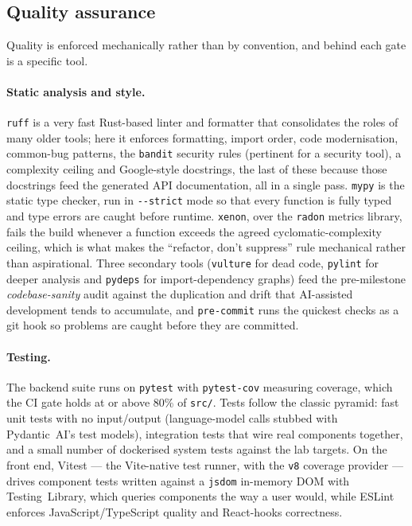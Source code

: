 \subsection{Quality assurance}
\label{subsec:qa}

Quality is enforced mechanically rather than by convention, and behind each gate is
a specific tool.

\paragraph{Static analysis and style.} \texttt{ruff} is a very fast Rust-based linter
and formatter that consolidates the roles of many older tools; here it enforces
formatting, import order, code modernisation, common-bug patterns, the \texttt{bandit}
security rules (pertinent for a security tool), a complexity ceiling and Google-style
docstrings, the last of these because those docstrings feed the generated API
documentation, all in a single pass. \texttt{mypy} is the static type checker, run in
\texttt{-{}-strict} mode so that every function is fully typed and type errors are
caught before runtime. \texttt{xenon}, over the \texttt{radon} metrics library, fails
the build whenever a function exceeds the agreed cyclomatic-complexity ceiling, which
is what makes the ``refactor, don't suppress'' rule mechanical rather than aspirational.
Three secondary tools (\texttt{vulture} for dead code, \texttt{pylint} for deeper
analysis and \texttt{pydeps} for import-dependency graphs) feed the pre-milestone
\emph{codebase-sanity} audit against the duplication and drift that AI-assisted
development tends to accumulate, and \texttt{pre-commit} runs the quickest checks as a
git hook so problems are caught before they are committed.

\paragraph{Testing.} The backend suite runs on \texttt{pytest} with \texttt{pytest-cov}
measuring coverage, which the CI gate holds at or above 80\% of \texttt{src/}. Tests
follow the classic pyramid: fast unit tests with no input/output (language-model
calls stubbed with Pydantic~AI's test models), integration tests that wire real
components together, and a small number of dockerised system tests against the lab
targets. On the front end, Vitest --- the Vite-native test runner, with the
\texttt{v8} coverage provider --- drives component tests written against a
\texttt{jsdom} in-memory DOM with Testing~Library, which queries components the way a
user would, while ESLint enforces JavaScript/TypeScript quality and React-hooks
correctness.

